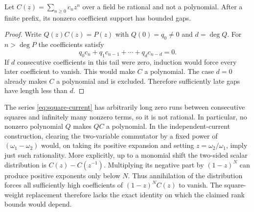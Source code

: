 \begin{lemma}
\label{lem:rational-gaps}
Let $C(z)=\sum_{n\ge0}c_nz^n$ over a field be rational and not a
polynomial.  After a finite prefix, its nonzero coefficient support has
bounded gaps.
\end{lemma}
\begin{proof}
Write $Q(z)C(z)=P(z)$ with $Q(0)=q_0\ne0$ and $d=\deg Q$.
For $n>\deg P$ the coefficients satisfy
\[
 q_0c_n+q_1c_{n-1}+\cdots+q_dc_{n-d}=0.
\]
If $d$ consecutive coefficients in this tail were zero, induction
would force every later coefficient to vanish.  This would make $C$
a polynomial.  The case $d=0$ already makes $C$ a polynomial and is
excluded.  Therefore sufficiently late gaps have length less than $d$.
\end{proof}

The series \eqref{eq:square-current} has arbitrarily long zero runs
between consecutive squares and infinitely many nonzero terms, so it is
not rational.  In particular, no nonzero polynomial $Q$ makes $QC$ a
polynomial.  In the independent-current construction, clearing the
two-variable commutator by a fixed power of $(\omega_1-\omega_2)$
would, on taking its positive expansion and setting
$z=\omega_2/\omega_1$, imply just such rationality.  More explicitly,
up to a monomial shift the two-sided scalar distribution is
$C(z)-C(z^{-1})$.  Multiplying its negative part by $(1-z)^N$ can
produce positive exponents only below $N$.  Thus annihilation of the
distribution forces all sufficiently high coefficients of
$(1-z)^NC(z)$ to vanish.  The square-weight
replacement therefore lacks the exact identity on which the claimed
rank bounds would depend.

